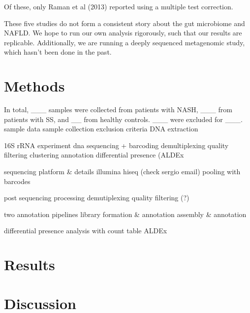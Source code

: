 Of these, only Raman et al (2013) reported using a multiple test correction.

These five studies do not form a consistent story about the gut microbiome and NAFLD. We hope to run our own analysis rigorously, such that our results are replicable. Additionally, we are running a deeply sequenced metagenomic study, which hasn’t been done in the past.

\FloatBarrier

\section{Methods}
In total, ___ samples were collected from patients with NASH, ___ from patients with SS, and __ from healthy controls. ___ were excluded for ___.
sample data
sample collection
exclusion criteria
DNA extraction

16S rRNA experiment
dna sequencing + barcoding
demultiplexing
quality filtering
clustering
annotation
differential presence (ALDEx

sequencing platform & details
illumina hiseq (check sergio email)
pooling with barcodes

post sequencing processing
demutiplexing
quality filtering (?)

two annotation pipelines
library formation & annotation
assembly & annotation

differential presence analysis with count table
ALDEx
\section{Results}
\section{Discussion}